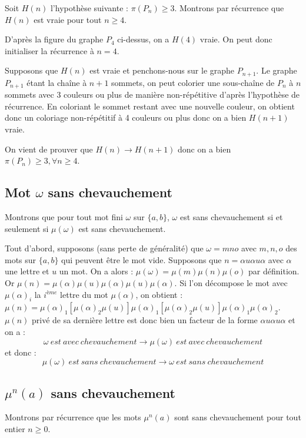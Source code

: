Soit $H(n)$ l'hypothèse suivante : $\pi(P_n) \geq 3$. Montrons par récurrence que $H(n)$ est vraie pour tout $n \geq 4$.

D'après la figure du graphe $P_4$ ci-dessus, on a $H(4)$ vraie. On peut donc initialiser la récurrence à $n=4$.

Supposons que $H(n)$ est vraie et penchons-nous sur le graphe $P_{n+1}$. Le graphe $P_{n+1}$ étant la chaîne à $n+1$ sommets, on peut colorier une sous-chaîne de $P_n$ à $n$ sommets avec 3 couleurs ou plus de manière non-répétitive d'après l'hypothèse de récurrence. En coloriant le sommet restant avec une nouvelle couleur, on obtient donc un coloriage non-répétitif à 4 couleurs ou plus donc on a bien $H(n+1)$ vraie.

On vient de prouver que $H(n) \rightarrow H(n+1)$ donc on a bien $\pi(P_n) \geq 3, \forall n \geq 4$.


\subsection{Mot $\omega$ sans chevauchement}
Montrons que pour tout mot fini $\omega$ sur $\{a,b\}$, $\omega$ est sans chevauchement si et seulement si $\mu(\omega)$ est sans chevauchement.

Tout d'abord, supposons (sans perte de généralité) que $\omega = mno$ avec $m,n,o$ des mots sur $\{a,b\}$ qui peuvent être le mot vide. Supposons que $n = \alpha u \alpha u \alpha$ avec $\alpha$ une lettre et $u$ un mot. On a alors : $\mu(\omega) = \mu(m)\mu(n)\mu(o)$ par définition. Or $\mu(n) = \mu(\alpha)\mu(u)\mu(\alpha)\mu(u)\mu(\alpha)$. Si l'on décompose le mot avec $\mu(\alpha)_i$ la $i^{ème}$ lettre du mot $\mu(\alpha)$, on obtient :  $\mu(n) = \mu(\alpha)_1\left[\mu(\alpha)_2\mu(u)\right]\mu(\alpha)_1\left[\mu(\alpha)_2\mu(u)\right]\mu(\alpha)_1\mu(\alpha)_2$. $\mu(n)$ privé de sa dernière lettre est donc bien un facteur de la forme $\alpha u \alpha u \alpha$ et on a :
$$ \omega\ est\ avec\ chevauchement \rightarrow \mu(\omega)\ est\ avec\ chevauchement $$
et donc :
$$ \mu(\omega)\ est\ sans\ chevauchement \rightarrow \omega\ est\ sans\ chevauchement $$



\subsection{$\mu^n(a)$ sans chevauchement}
Montrons par récurrence que les mots $\mu^n(a)$ sont sans chevauchement pour tout entier $n \geq 0$.

